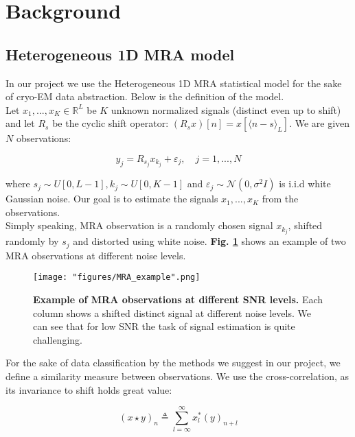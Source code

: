 \center

\section{Background}

\raggedright

\subsection{Heterogeneous 1D \acrlong{MRA} model}

In our project we use the Heterogeneous 1D \acrfull{MRA} statistical model\cite{boumal2018heterogeneous} for the sake of \acrshort{cryo-EM} data abstraction. Below is the definition of the model.\\
Let $x_1,...,x_K \in \mathbb{R}^L$ be $K$ unknown normalized signals (distinct even up to shift) and let $R_s$ be the cyclic shift operator: $(R_sx)[n]=x[\langle n-s \rangle_L]$. We are given $N$ observations:

\begin{equation}
\label{eqn:MRA_obs}
y_j = R_{s_j} x_{k_j} + \varepsilon_j, \quad j=1,...,N
\end{equation}

where $s_j \sim U[0, L-1],k_j \sim U[0, K-1]$ and $\varepsilon_j \sim \mathcal{N}(0,\sigma^2I)$ is i.i.d white Gaussian noise. Our goal is to estimate the signals 
$x_1,...,x_K$ from the observations.\\
Simply speaking, \acrshort{MRA} observation is a randomly chosen signal $x_{k_j}$, shifted randomly by $s_j$ and distorted using white noise. \textbf{Fig.  \ref{fig:MRA_exmp}} shows an example of two \acrshort{MRA} observations at different noise levels.

\begin{figure}[h]
  \centering
  \texttt{[image: "figures/MRA\_example".png]}
  \caption{\textbf{Example of \acrshort{MRA} observations at different SNR levels.} Each column shows a shifted distinct signal at different noise levels. We can see that for low \acrshort{SNR} the task of signal estimation is quite challenging.}
  \label{fig:MRA_exmp}
\end{figure}

For the sake of data classification by the methods we suggest in our project, we define a similarity measure between observations. We use the cross-correlation, as its invariance to shift holds great value:

\begin{equation}
\label{eqn:sim_def}
(x \star y)_n \triangleq \sum_{l=\infty}^{\infty}x^*_l(y)_{n+l}
\end{equation}


